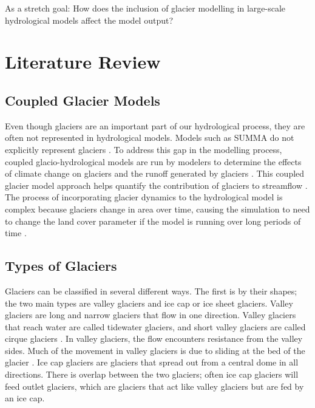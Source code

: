 \documentclass{article}
\begin{document}
As a stretch goal: How does the inclusion of glacier modelling in large-scale hydrological models affect the model output?



\section{Literature Review}

\subsection{Coupled Glacier Models} 
Even though glaciers are an important part of our hydrological process, they are often not represented in hydrological models. Models such as SUMMA do not explicitly represent glaciers \citep{Clark2015}. To address this gap in the modelling process, coupled glacio-hydrological models are run by modelers to determine the effects of climate change on glaciers and the runoff generated by glaciers \citep{Jost2012, Naz2014}. This coupled glacier model approach helps quantify the contribution of glaciers to streamflow \citep{Jost2012}. The process of incorporating glacier dynamics to the hydrological model is complex because glaciers change in area over time, causing the simulation to need to change the land cover parameter if the model is running over long periods of time \citep{Jost2012}. 

\subsection{Types of Glaciers}
Glaciers can be classified in several different ways. The first is by their shapes; the two main types are valley glaciers and ice cap or ice sheet glaciers. Valley glaciers are long and narrow glaciers that flow in one direction. Valley glaciers that reach water are called tidewater glaciers, and short valley glaciers are called cirque glaciers \citep{Hooke2013}. In valley glaciers, the flow encounters resistance from the valley sides. Much of the movement in valley glaciers is due to sliding at the bed of the glacier \citep{Nye1952}. Ice cap glaciers are glaciers that spread out from a central dome in all directions. There is overlap between the two glaciers; often ice cap glaciers will feed outlet glaciers, which are glaciers that act like valley glaciers but are fed by an ice cap.
\end{document}
